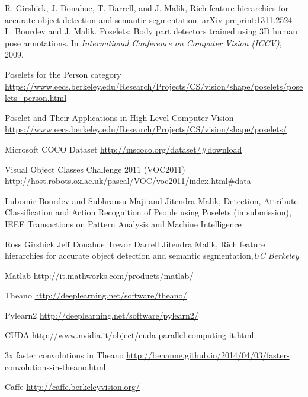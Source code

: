 \begin{thebibliography}{30}

 R. Girshick, J. Donahue, T. Darrell, and J. Malik, Rich feature hierarchies for accurate object detection and semantic segmentation. arXiv preprint:1311.2524\\


 L. Bourdev and J. Malik. Poselets: Body part detectors trained using 3D human pose annotations. In \textit{International Conference on Computer Vision (ICCV)}, 2009.

 Poselets for the Person category
\url{https://www.eecs.berkeley.edu/Research/Projects/CS/vision/shape/poselets/poselets_person.html}

 Poselet and Their Applications in High-Level Computer Vision
\url{https://www.eecs.berkeley.edu/Research/Projects/CS/vision/shape/poselets/}

 Microsoft COCO Dataset
\url{http://mscoco.org/dataset/#download}

 Visual Object Classes Challenge 2011 (VOC2011)
\url{http://host.robots.ox.ac.uk/pascal/VOC/voc2011/index.html#data}

Lubomir Bourdev and Subhransu Maji and Jitendra Malik, Detection, Attribute Classification and Action Recognition of People using Poselets (in submission), IEEE Transactions on Pattern Analysis and Machine Intelligence

Ross Girshick Jeff Donahue Trevor Darrell Jitendra Malik, Rich feature hierarchies for accurate object detection and semantic segmentation,\textit{UC Berkeley}

 Matlab
\url{http://it.mathworks.com/products/matlab/}

 Theano
\url{http://deeplearning.net/software/theano/}

 Pylearn2
\url{http://deeplearning.net/software/pylearn2/}

 CUDA
\url{http://www.nvidia.it/object/cuda-parallel-computing-it.html}

 3x faster convolutions in Theano
\url{http://benanne.github.io/2014/04/03/faster-convolutions-in-theano.html}

 Caffe
\url{http://caffe.berkeleyvision.org/}

\end{thebibliography}
